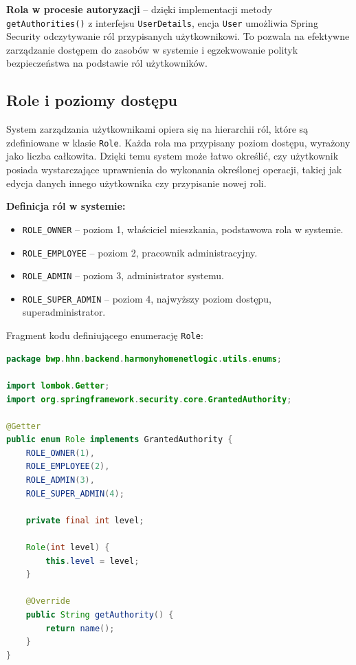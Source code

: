 \textbf{Rola w procesie autoryzacji} -- dzięki implementacji metody \texttt{getAuthorities()} z interfejsu \texttt{UserDetails}, encja \texttt{User} umożliwia Spring Security odczytywanie ról przypisanych użytkownikowi. To pozwala na efektywne zarządzanie dostępem do zasobów w systemie i egzekwowanie polityk bezpieczeństwa na podstawie ról użytkowników.


\subsection{Role i poziomy dostępu}

System zarządzania użytkownikami opiera się na hierarchii ról, które są zdefiniowane w klasie \texttt{Role}. Każda rola ma przypisany poziom dostępu, wyrażony jako liczba całkowita. Dzięki temu system może łatwo określić, czy użytkownik posiada wystarczające uprawnienia do wykonania określonej operacji, takiej jak edycja danych innego użytkownika czy przypisanie nowej roli.

\textbf{Definicja ról w systemie:}
\begin{itemize}
    \item \texttt{ROLE\_OWNER} -- poziom 1, właściciel mieszkania, podstawowa rola w systemie.
    \item \texttt{ROLE\_EMPLOYEE} -- poziom 2, pracownik administracyjny.
    \item \texttt{ROLE\_ADMIN} -- poziom 3, administrator systemu.
    \item \texttt{ROLE\_SUPER\_ADMIN} -- poziom 4, najwyższy poziom dostępu, superadministrator.
\end{itemize}

Fragment kodu definiującego enumerację \texttt{Role}:
\begin{lstlisting}[language=Java, caption=Definicja ról w systemie \texttt{Role}]
package bwp.hhn.backend.harmonyhomenetlogic.utils.enums;

import lombok.Getter;
import org.springframework.security.core.GrantedAuthority;

@Getter
public enum Role implements GrantedAuthority {
    ROLE_OWNER(1),
    ROLE_EMPLOYEE(2),
    ROLE_ADMIN(3),
    ROLE_SUPER_ADMIN(4);

    private final int level;

    Role(int level) {
        this.level = level;
    }

    @Override
    public String getAuthority() {
        return name();
    }
}
\end{lstlisting}

